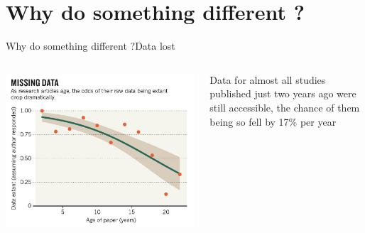 \documentclass{eecslides}
\begin{document}
\section{Why do something different ?}


\begin{frame}{Why do something different ?}{Data lost}


\begin{columns}[c]
	\begin{column}{.50\paperwidth}
		\includegraphics[width=.50\paperwidth]{Nature_fig.jpg}
	\end{column}
	\begin{column}{.4\paperwidth}
		 Data for almost all studies published just two years ago were still accessible, the chance of them being so \alert{fell by 17\% per year} \citep{Vines2013}
	\end{column}
\end{columns}

\end{frame}

\end{document}
